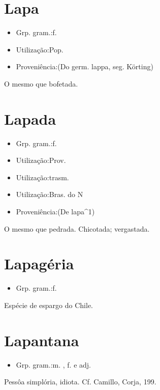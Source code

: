 \section{Lapa}
\begin{itemize}
\item {Grp. gram.:f.}
\end{itemize}
\begin{itemize}
\item {Utilização:Pop.}
\end{itemize}
\begin{itemize}
\item {Proveniência:(Do germ. \textunderscore lappa\textunderscore , seg. Körting)}
\end{itemize}
O mesmo que \textunderscore bofetada\textunderscore .
\section{Lapada}
\begin{itemize}
\item {Grp. gram.:f.}
\end{itemize}
\begin{itemize}
\item {Utilização:Prov.}
\end{itemize}
\begin{itemize}
\item {Utilização:trasm.}
\end{itemize}
\begin{itemize}
\item {Utilização:Bras. do N}
\end{itemize}
\begin{itemize}
\item {Proveniência:(De \textunderscore lapa\textunderscore ^1)}
\end{itemize}
O mesmo que \textunderscore pedrada\textunderscore .
Chicotada; vergastada.
\section{Lapagéria}
\begin{itemize}
\item {Grp. gram.:f.}
\end{itemize}
Espécie de espargo do Chile.
\section{Lapantana}
\begin{itemize}
\item {Grp. gram.:m. ,  f.  e  adj.}
\end{itemize}
Pessôa simplória, idiota. Cf. Camillo, \textunderscore Corja\textunderscore , 199.
